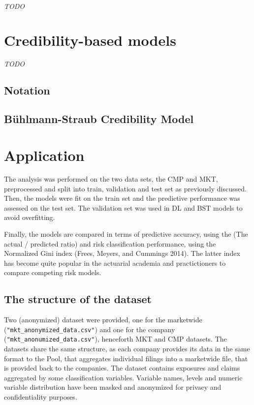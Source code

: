 \documentclass[
]{article}
\begin{document}
\emph{TODO}

\hypertarget{credibility-based-models}{%
\section{Credibility-based models}\label{credibility-based-models}}

\emph{TODO}

\hypertarget{notation}{%
\subsection{Notation}\label{notation}}

\hypertarget{buxfchlmann-straub-credibility-model}{%
\subsection{Bühlmann-Straub Credibility
Model}\label{buxfchlmann-straub-credibility-model}}

\hypertarget{application}{%
\section{Application}\label{application}}

The analysis was performed on the two data sets, the CMP and MKT,
preprocessed and split into train, validation and test set as previously
discussed. Then, the models were fit on the train set and the predictive
performance was assessed on the test set. The validation set was used in
DL and BST models to avoid overfitting.

Finally, the models are compared in terms of predictive accuracy, using
the (The actual / predicted ratio) and risk classification performance,
using the Normalized Gini index (Frees, Meyers, and Cummings 2014). The
latter index has become quite popular in the actuarial academia and
practictioners to compare competing risk models.

\hypertarget{the-structure-of-the-dataset}{%
\subsection{The structure of the
dataset}\label{the-structure-of-the-dataset}}

Two (anonymized) dataset were provided, one for the marketwide
(\texttt{"mkt\_anonymized\_data.csv"}) and one for the company
(\texttt{"mkt\_anonumized\_data.csv"}), henceforth MKT and CMP datasets.
The datasets share the same structure, as each company provides its data
in the same format to the Pool, that aggregates individual filings into
a marketwide file, that is provided back to the companies. The dataset
contains exposures and claims aggregated by some classification
variables. Variable names, levels and numeric variable distribution have
been masked and anonymized for privacy and confidentiality purposes.
\end{document}
